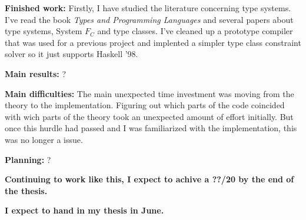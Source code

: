 \documentclass[12pt]{report}
\begin{document}
\vspace{1cm}
{\bf Finished work:}
Firstly, I have studied the literature concerning type systems. I've read the
book \textit{Types and Programming Languages} and several papers about type
systems, System $F_C$ and type classes. I've cleaned up a prototype compiler
that was used for a previous project and implented a simpler type class
constraint solver so it just supports Haskell '98.


\vspace{1cm}
{\bf Main results:}
? %


\vspace{1cm}
{\bf Main difficulties:}
The main unexpected time investment was moving from the theory to the
implementation. Figuring out which parts of the code coincided with wich parts
of the theory took an unexpected amount of effort initially. But once this
hurdle had passed and I was familiarized with the implementation, this was no
longer a issue.

\vspace{1cm}
{\bf Planning:}
? %

\vspace{1cm}
{\bf Continuing to work like this, I expect to achive a ??/20 by the end of the
thesis.}

{\bf I expect to hand in my thesis in June.}
\end{document}
